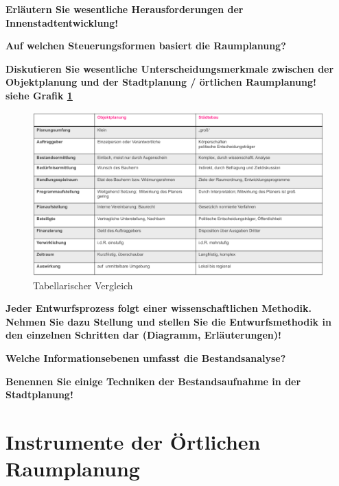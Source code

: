 \documentclass[]{article}
\newenvironment{question}{\vspace{8mm}\noindent\bfseries}{\\}
\begin{document}
\begin{question}
	Erläutern Sie wesentliche Herausforderungen der Innenstadtentwicklung!
\end{question}


\begin{question}
	Auf welchen Steuerungsformen basiert die Raumplanung?
\end{question}


\begin{question}
	Diskutieren Sie wesentliche Unterscheidungsmerkmale zwischen der Objektplanung und der Stadtplanung / örtlichen Raumplanung!
\end{question}
siehe Grafik \ref{fig:vergleichstaedtebauobjektplanung}
\begin{figure}[h!]
	\centering
	\includegraphics[width=0.7\linewidth]{images/vergleich_staedtebau_objektplanung}
	\caption{Tabellarischer Vergleich}
	\label{fig:vergleichstaedtebauobjektplanung}
\end{figure}


\begin{question}
	Jeder Entwurfsprozess folgt einer wissenschaftlichen Methodik. Nehmen Sie dazu Stellung und stellen Sie die Entwurfsmethodik in den einzelnen Schritten dar (Diagramm, Erläuterungen)!
\end{question}


\begin{question}
	Welche Informationsebenen umfasst die Bestandsanalyse?
\end{question}


\begin{question}
	Benennen Sie einige Techniken der Bestandsaufnahme in der Stadtplanung!
\end{question}


\section{Instrumente der Örtlichen Raumplanung}
\end{document}
